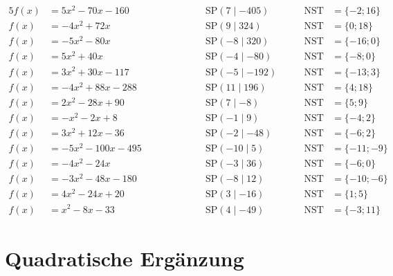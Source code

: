 \documentclass
[
  draft    = true,
  fontsize = 11pt,
  parskip  = half-,
  BCOR     = 0pt,
  DIV      = 11
]
{scrartcl}
\begin{document}
\begin{alignat*}{5}
  f(x)&=5x^{2}-70x-160 \qquad&\qquad \quad&\text{SP}(7\mid-405) \quad&\quad \text{NST}&=\{-2;16\} \\[0.5ex]
  f(x)&=-4x^{2}+72x \qquad&\qquad \quad&\text{SP}(9\mid324) \quad&\quad \text{NST}&=\{0;18\} \\[0.5ex]
  f(x)&=-5x^{2}-80x \qquad&\qquad \quad&\text{SP}(-8\mid320) \quad&\quad \text{NST}&=\{-16;0\} \\[0.5ex]
  f(x)&=5x^{2}+40x \qquad&\qquad \quad&\text{SP}(-4\mid-80) \quad&\quad \text{NST}&=\{-8;0\} \\[0.5ex]
  f(x)&=3x^{2}+30x-117 \qquad&\qquad \quad&\text{SP}(-5\mid-192) \quad&\quad \text{NST}&=\{-13;3\} \\[0.5ex]
  f(x)&=-4x^{2}+88x-288 \qquad&\qquad \quad&\text{SP}(11\mid196) \quad&\quad \text{NST}&=\{4;18\} \\[0.5ex]
  f(x)&=2x^{2}-28x+90 \qquad&\qquad \quad&\text{SP}(7\mid-8) \quad&\quad \text{NST}&=\{5;9\} \\[0.5ex]
  f(x)&=-x^{2}-2x+8 \qquad&\qquad \quad&\text{SP}(-1\mid9) \quad&\quad \text{NST}&=\{-4;2\} \\[0.5ex]
  f(x)&=3x^{2}+12x-36 \qquad&\qquad \quad&\text{SP}(-2\mid-48) \quad&\quad \text{NST}&=\{-6;2\} \\[0.5ex]
  f(x)&=-5x^{2}-100x-495 \qquad&\qquad \quad&\text{SP}(-10\mid5) \quad&\quad \text{NST}&=\{-11;-9\} \\[0.5ex]
  f(x)&=-4x^{2}-24x \qquad&\qquad \quad&\text{SP}(-3\mid36) \quad&\quad \text{NST}&=\{-6;0\} \\[0.5ex]
  f(x)&=-3x^{2}-48x-180 \qquad&\qquad \quad&\text{SP}(-8\mid12) \quad&\quad \text{NST}&=\{-10;-6\} \\[0.5ex]
  f(x)&=4x^{2}-24x+20 \qquad&\qquad \quad&\text{SP}(3\mid-16) \quad&\quad \text{NST}&=\{1;5\} \\[0.5ex]
  f(x)&=x^{2}-8x-33 \qquad&\qquad \quad&\text{SP}(4\mid-49) \quad&\quad \text{NST}&=\{-3;11\}
\end{alignat*}

\clearpage
\section*{Quadratische Ergänzung}
\end{document}
